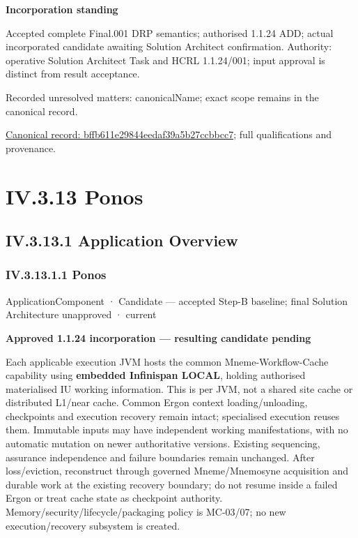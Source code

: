\par\medskip\textbf{Incorporation standing}\par


Accepted complete Final.001 DRP semantics; authorised 1.1.24 ADD; actual incorporated candidate awaiting Solution Architect confirmation. Authority: operative Solution Architect Task and HCRL 1.1.24/001; input approval is distinct from result acceptance.


{\small Recorded unresolved matters: canonicalName; exact scope remains in the canonical record.}\par
{\footnotesize \href{../../../../../../../continuum/application/application-service/bffb611e29844eedaf39a5b27ccbbcc7.md}{Canonical record: bffb611e29844eedaf39a5b27ccbbcc7}; full qualifications and provenance.}\par
\section*{IV.3.13 Ponos}
\label{navigation:IV.3.13}

\subsection*{IV.3.13.1 Application Overview}
\label{navigation:IV.3.13.1}

\subsubsection*{IV.3.13.1.1 Ponos}
\label{navigation:IV.3.13.1.1}

\label{element:b521762c1ea444b48cd5f66be3752d30}
{\small ApplicationComponent · Candidate — accepted Step-B baseline; final Solution Architecture unapproved · current}\par

\par\medskip\textbf{Approved 1.1.24 incorporation — resulting candidate pending}\par


Each applicable execution JVM hosts the common Mneme-Workflow-Cache capability using \textbf{embedded Infinispan LOCAL}, holding authorised materialised IU working information. This is per JVM, not a shared site cache or distributed L1/near cache. Common Ergon context loading/unloading, checkpoints and execution recovery remain intact; specialised execution reuses them. Immutable inputs may have independent working manifestations, with no automatic mutation on newer authoritative versions. Existing sequencing, assurance independence and failure boundaries remain unchanged. After loss/eviction, reconstruct through governed Mneme/Mnemosyne acquisition and durable work at the existing recovery boundary; do not resume inside a failed Ergon or treat cache state as checkpoint authority. Memory/security/lifecycle/packaging policy is MC-03/07; no new execution/recovery subsystem is created.



